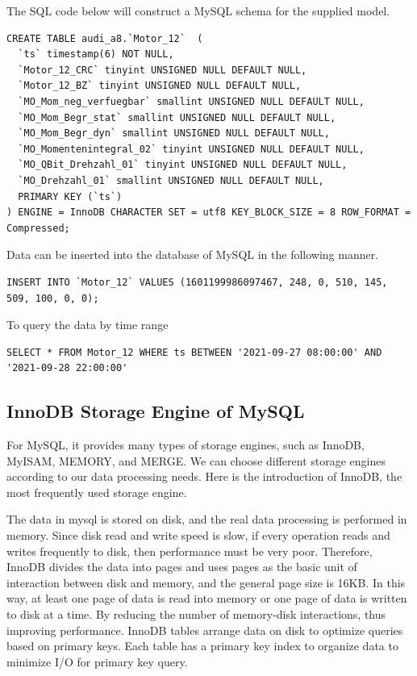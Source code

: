 The SQL code below will construct a MySQL schema for the supplied model.

\begin{verbatim}
CREATE TABLE audi_a8.`Motor_12`  (
  `ts` timestamp(6) NOT NULL,
  `Motor_12_CRC` tinyint UNSIGNED NULL DEFAULT NULL,
  `Motor_12_BZ` tinyint UNSIGNED NULL DEFAULT NULL,
  `MO_Mom_neg_verfuegbar` smallint UNSIGNED NULL DEFAULT NULL,
  `MO_Mom_Begr_stat` smallint UNSIGNED NULL DEFAULT NULL,
  `MO_Mom_Begr_dyn` smallint UNSIGNED NULL DEFAULT NULL,
  `MO_Momentenintegral_02` tinyint UNSIGNED NULL DEFAULT NULL,
  `MO_QBit_Drehzahl_01` tinyint UNSIGNED NULL DEFAULT NULL,
  `MO_Drehzahl_01` smallint UNSIGNED NULL DEFAULT NULL,
  PRIMARY KEY (`ts`)
) ENGINE = InnoDB CHARACTER SET = utf8 KEY_BLOCK_SIZE = 8 ROW_FORMAT = Compressed;
\end{verbatim}

Data can be inserted into the database of MySQL in the following manner.
 
\begin{verbatim}
INSERT INTO `Motor_12` VALUES (1601199986097467, 248, 0, 510, 145, 509, 100, 0, 0);
\end{verbatim}

To query the data by time range
\begin{verbatim}
SELECT * FROM Motor_12 WHERE ts BETWEEN '2021-09-27 08:00:00' AND '2021-09-28 22:00:00'
\end{verbatim}

\subsection{InnoDB Storage Engine of MySQL}
For MySQL, it provides many types of storage engines, such as InnoDB, MyISAM, MEMORY, and MERGE. We can choose different storage engines according to our data processing needs. Here is the introduction of InnoDB, the most frequently used storage engine.

The data in mysql is stored on disk, and the real data processing is performed in memory. Since disk read and write speed is slow, if every operation reads and writes frequently to disk, then performance must be very poor. Therefore, InnoDB divides the data into pages and uses pages as the basic unit of interaction between disk and memory, and the general page size is 16KB. In this way, at least one page of data is read into memory or one page of data is written to disk at a time. By reducing the number of memory-disk interactions, thus improving performance. InnoDB tables arrange data on disk to optimize queries based on primary keys. Each table has a primary key index to organize data to minimize I/O for primary key query.


